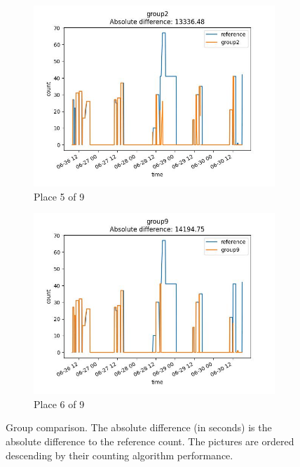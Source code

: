 \begin{figure}
    \begin{subfigure}[b]{0.45\textwidth}
        \includegraphics[width=\linewidth]{figures/ref-group2.jpeg}
        \caption{Place 5 of 9}
    \end{subfigure}
    \begin{subfigure}[b]{0.45\textwidth}
        \includegraphics[width=\linewidth]{figures/ref-group9.jpeg}
        \caption{Place 6 of 9}
    \end{subfigure}

    \caption{Group comparison. The absolute difference (in seconds) is the absolute difference to the reference count.
        The pictures are ordered descending by their counting algorithm performance.}
    \label{fig_comparison}
\end{figure}

